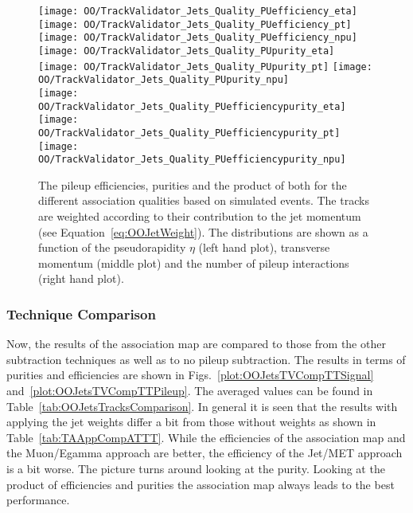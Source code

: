 \begin{figure}[h!t]
  \centering
  \texttt{[image: OO/TrackValidator\_Jets\_Quality\_PUefficiency\_eta]}
  \texttt{[image: OO/TrackValidator\_Jets\_Quality\_PUefficiency\_pt]}
  \texttt{[image: OO/TrackValidator\_Jets\_Quality\_PUefficiency\_npu]}
  \\
  \texttt{[image: OO/TrackValidator\_Jets\_Quality\_PUpurity\_eta]}
  \texttt{[image: OO/TrackValidator\_Jets\_Quality\_PUpurity\_pt]}
  \texttt{[image: OO/TrackValidator\_Jets\_Quality\_PUpurity\_npu]}
  \\
  \texttt{[image: OO/TrackValidator\_Jets\_Quality\_PUefficiencypurity\_eta]}
  \texttt{[image: OO/TrackValidator\_Jets\_Quality\_PUefficiencypurity\_pt]}
  \texttt{[image: OO/TrackValidator\_Jets\_Quality\_PUefficiencypurity\_npu]}
  \caption[Pileup efficiencies, purities and their product for the different qualities based on simulated \ttbar events with jet weight]{The pileup efficiencies, purities and the product of both for the different association qualities based on simulated \ttbar events. The tracks are weighted according to their contribution to the jet momentum (see Equation~\ref{eq:OOJetWeight}). The distributions are shown as a function of the pseudorapidity $\eta$ (left hand plot), transverse momentum (middle plot) and the number of pileup interactions (right hand plot). \label{plot:OOJetsTVQualTTPileup}}
\end{figure}



\subsubsection{Technique Comparison \label{sec:OOJetsTracksComparison} }

Now, the results of the association map are compared to those from the other subtraction techniques as well as to no pileup subtraction. The results in terms of purities and efficiencies are shown in Figs.~\ref{plot:OOJetsTVCompTTSignal} and~\ref{plot:OOJetsTVCompTTPileup}. The averaged values can be found in Table~\ref{tab:OOJetsTracksComparison}. In general it is seen that the results with applying the jet weights differ a bit from those without weights as shown in Table~\ref{tab:TAAppCompATTT}. While the efficiencies of the association map and the Muon/Egamma approach are better, the efficiency of the Jet/MET approach is a bit worse. The picture turns around looking at the purity. Looking at the product of efficiencies and purities the association map always leads to the best performance.

